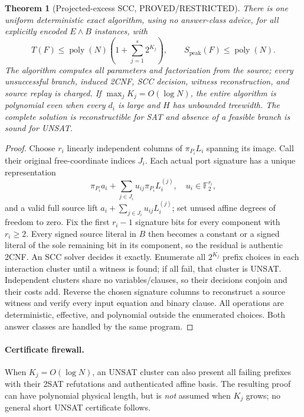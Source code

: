 \documentclass[11pt]{article}
\newtheorem{theorem}{Theorem}
\newcommand{\FF}{\mathbb F_2}
\newcommand{\poly}{\operatorname{poly}}
\begin{document}
\begin{theorem}[Projected-excess SCC, PROVED/RESTRICTED]
There is one uniform deterministic exact algorithm, using no answer-class advice, for all explicitly encoded $E\land B$ instances, with
\[
 T(F)\le \poly(N)\left(1+\sum_{j=1}^{s}2^{K_j}\right),
 \qquad S_{\mathrm{peak}}(F)\le \poly(N).
 \tag{1}
\]
The algorithm computes all parameters and factorization from the source; every unsuccessful branch, induced 2CNF, SCC decision, witness reconstruction, and source replay is charged. If $\max_jK_j=O(\log N)$, the entire algorithm is polynomial even when every $d_i$ is large and $H$ has unbounded treewidth. The complete solution is reconstructible for SAT and absence of a feasible branch is sound for UNSAT.
\end{theorem}
\begin{proof}
Choose $r_i$ linearly independent columns of $\pi_{P_i}L_i$ spanning its image. Call their original free-coordinate indices $J_i$. Each actual port signature has a unique representation
\[
 \pi_{P_i}a_i+\sum_{j\in J_i}u_{ij}\pi_{P_i}L_i^{(j)},\quad
 u_i\in\FF^{r_i},
 \tag{2}
\]
and a valid full source lift $a_i+\sum_{j\in J_i}u_{ij}L_i^{(j)}$; set unused affine degrees of freedom to zero. Fix the first $r_i-1$ signature bits for every component with $r_i\ge2$. Every signed source literal in $B$ then becomes a constant or a signed literal of the sole remaining bit in its component, so the residual is authentic 2CNF. An SCC solver decides it exactly. Enumerate all $2^{K_j}$ prefix choices in each interaction cluster until a witness is found; if all fail, that cluster is UNSAT. Independent clusters share no variables/clauses, so their decisions conjoin and their costs add. Reverse the chosen signature columns to reconstruct a source witness and verify every input equation and binary clause. All operations are deterministic, effective, and polynomial outside the enumerated choices. Both answer classes are handled by the same program.\end{proof}

\paragraph{Certificate firewall.} When $K_j=O(\log N)$, an UNSAT cluster can also present all failing prefixes with their 2SAT refutations and authenticated affine basis. The resulting proof can have polynomial physical length, but is \emph{not} assumed when $K_j$ grows; no general short UNSAT certificate follows.
\end{document}
